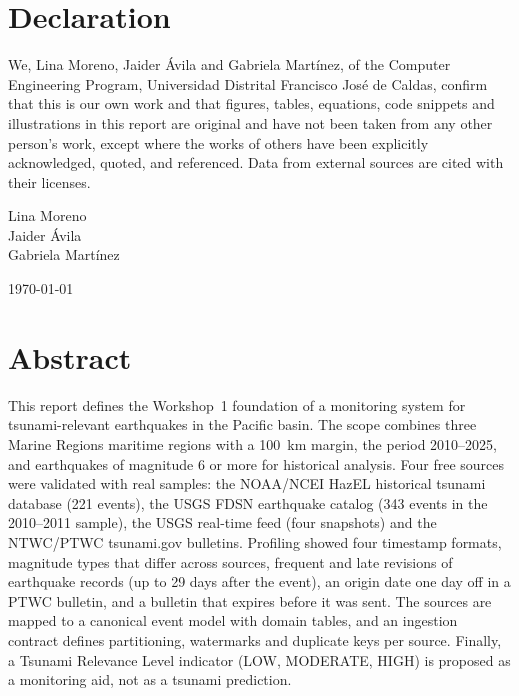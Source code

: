 \documentclass[a4paper,11pt,oneside]{book}
\begin{document}
    \chapter*{\Large Declaration}
    We, Lina Moreno, Jaider \'Avila and Gabriela Mart\'inez, of the Computer Engineering Program, Universidad Distrital Francisco Jos\'e de Caldas, confirm that this is our own work and that figures, tables, equations, code snippets and illustrations in this report are original and have not been taken from any other person's work, except where the works of others have been explicitly acknowledged, quoted, and referenced. Data from external sources are cited with their licenses.
    ~\\[1cm]
    \begin{flushright}
    Lina Moreno\\
    Jaider \'Avila\\
    Gabriela Mart\'inez

    \today
    \end{flushright}

    \chapter*{Abstract}
    This report defines the Workshop~1 foundation of a monitoring system for tsunami-relevant earthquakes in the Pacific basin.
The scope combines three Marine Regions maritime regions with a 100~km margin, the period 2010--2025, and earthquakes of magnitude 6 or more for historical analysis.
Four free sources were validated with real samples: the NOAA/NCEI HazEL historical tsunami database (221 events), the USGS FDSN earthquake catalog (343 events in the 2010--2011 sample), the USGS real-time feed (four snapshots) and the NTWC/PTWC tsunami.gov bulletins.
Profiling showed four timestamp formats, magnitude types that differ across sources, frequent and late revisions of earthquake records (up to 29 days after the event), an origin date one day off in a PTWC bulletin, and a bulletin that expires before it was sent.
The sources are mapped to a canonical event model with domain tables, and an ingestion contract defines partitioning, watermarks and duplicate keys per source.
Finally, a Tsunami Relevance Level indicator (LOW, MODERATE, HIGH) is proposed as a monitoring aid, not as a tsunami prediction.
\end{document}
